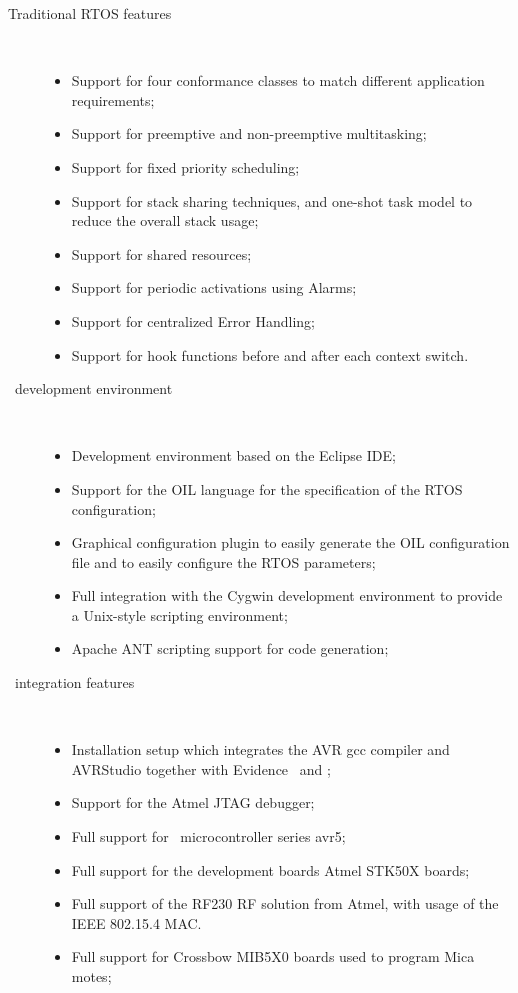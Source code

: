\begin{description}
\item[Traditional RTOS features] ~
  \begin{itemize}
  \item Support for four conformance classes to match different
    application requirements;
  \item Support for preemptive and non-preemptive multitasking;
  \item Support for fixed priority scheduling;
  \item Support for stack sharing techniques, and one-shot task model
    to reduce the overall stack usage;
  \item Support for shared resources;
  \item Support for periodic activations using Alarms;
  \item Support for centralized Error Handling;
  \item Support for hook functions before and after each context
    switch.
  \end{itemize}

\item[\rtd\ development environment] ~
  \begin{itemize}
  \item Development environment based on the Eclipse IDE;
  \item Support for the OIL language for the specification of the RTOS
    configuration;
  \item Graphical configuration plugin to easily generate the OIL
    configuration file and to easily configure the RTOS parameters;
  \item Full integration with the Cygwin development environment to
    provide a Unix-style scripting environment;
  \item Apache ANT scripting support for code generation;
  \end{itemize}

\item[\avr\ integration features] ~
  \begin{itemize}
  \item Installation setup which integrates the AVR gcc compiler and
    AVRStudio together with Evidence \ee\ and \rtd;
  \item Support for the Atmel JTAG debugger;
  \item Full support for \avr\ microcontroller series avr5;
  \item Full support for the development boards Atmel STK50X boards;
  \item Full support of the RF230 RF solution from Atmel, with usage
    of the IEEE 802.15.4 MAC.
  \item Full support for Crossbow MIB5X0 boards used to program Mica
    motes;
  \end{itemize}
\end{description}


